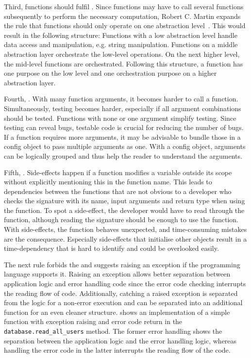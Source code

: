 Third, functions should fulfil . Since functions may have to call several functions subsequently to perform the necessary computation, Robert C. Martin expands the rule that functions should only operate on one abstraction level~\cite{martin_clean_2009}. This would result in the following structure:
Functions with a low abstraction level handle data access and manipulation, e.g. string manipulation. Functions on a middle abstraction layer orchestrate the low-level operations. On the next higher level, the mid-level functions are orchestrated. Following this structure, a function has one purpose on the low level and one orchestration purpose on a higher abstraction layer. 

Fourth, . With many function arguments, it becomes harder to call a function. Simultaneously, testing becomes harder, especially if all argument combinations should be tested. Functions with none or one argument simplify testing. Since testing can reveal bugs, testable code is crucial for reducing the number of bugs.
If a function requires more arguments, it may be advisable to bundle those in a config object to pass multiple arguments as one. With a config object, arguments can be logically grouped and thus help the reader to understand the arguments. 

Fifth, . Side-effects happen if a function modifies a variable outside its scope without explicitly mentioning this in the function name. This leads to dependencies between the functions that are not obvious to a developer who checks the signature with its name, input arguments and return type when using the function. To spot a side-effect, the developer would have to read through the function, although reading the signature should be enough to use the function. With side-effects, the function behaves unexpected, and time-consuming mistakes are the consequence. Especially side-effects that initialise other objects result in a time-dependency that is hard to identify and could be overlooked easily.

The next rule forbids the  and suggests raising an exception if the programming language supports it. Raising an exception allows better separation between application logic and error handling code since the error code checking interrupts the reading flow of code. Additionally, catching a raised exception is separated from the logic for a non-error execution and can be separated into an additional function for an even cleaner structure.  shows an implementation of a simple function with exception raising and error code return in the \texttt{database.read\_all\_users} method. The former error handling shows the separation between the application logic and the error handling logic, whereas handling the error code in the latter interrupts the reading flow of the code.

